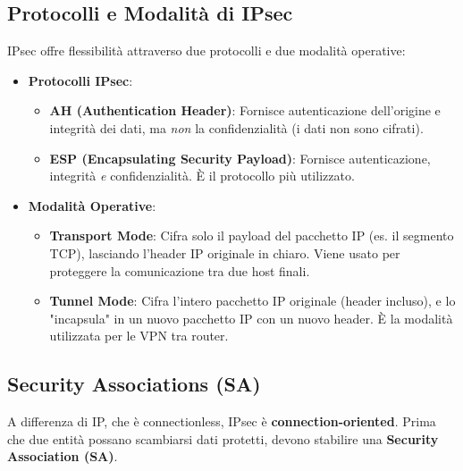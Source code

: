 \subsection{Protocolli e Modalità di IPsec}
IPsec offre flessibilità attraverso due protocolli e due modalità operative:
\begin{itemize}
    \item \textbf{Protocolli IPsec}:
    \begin{itemize}
        \item \textbf{AH (Authentication Header)}: Fornisce autenticazione dell'origine e integrità dei dati, ma \textit{non} la confidenzialità (i dati non sono cifrati).
        \item \textbf{ESP (Encapsulating Security Payload)}: Fornisce autenticazione, integrità \textit{e} confidenzialità. È il protocollo più utilizzato.
    \end{itemize}
    \item \textbf{Modalità Operative}:
    \begin{itemize}
        \item \textbf{Transport Mode}: Cifra solo il payload del pacchetto IP (es. il segmento TCP), lasciando l'header IP originale in chiaro. Viene usato per proteggere la comunicazione tra due host finali.
        \item \textbf{Tunnel Mode}: Cifra l'intero pacchetto IP originale (header incluso), e lo "incapsula" in un nuovo pacchetto IP con un nuovo header. È la modalità utilizzata per le VPN tra router.
    \end{itemize}
\end{itemize}


\subsection{Security Associations (SA)}
A differenza di IP, che è connectionless, IPsec è \textbf{connection-oriented}. Prima che due entità possano scambiarsi dati protetti, devono stabilire una \textbf{Security Association (SA)}.


